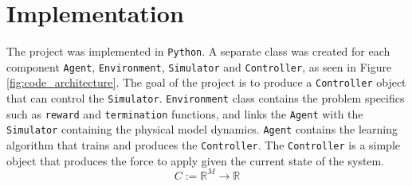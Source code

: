 \documentclass[final]{LTHtwocol} %
\begin{document}






%

\section{Implementation}
The project was implemented in \texttt{Python}.
A separate class was created for each component \texttt{Agent}, \texttt{Environment}, \texttt{Simulator} and \texttt{Controller}, as seen in Figure \ref{fig:code_architecture}.
The goal of the project is to produce a \texttt{Controller} object that can control the \texttt{Simulator}.
\texttt{Environment} class contains the problem specifics such as \texttt{reward} and \texttt{termination} functions, and links the \texttt{Agent} with the \texttt{Simulator} containing the physical model dynamics.
\texttt{Agent} contains the learning algorithm that trains and produces the \texttt{Controller}.
The \texttt{Controller} is a simple object that produces the force to apply given the current state of the system.
\begin{equation}
	C := \mathbb{R}^M \to \mathbb{R}
\end{equation}
\end{document}
